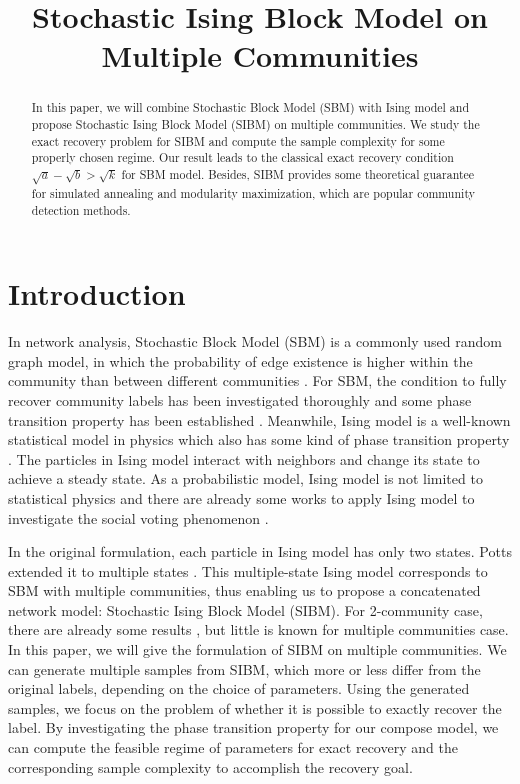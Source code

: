 \label{key}\documentclass[conference]{IEEEtran}
\title{Stochastic Ising Block Model on Multiple Communities}
\author{%
	\IEEEauthorblockN{Feng Zhao}
	\IEEEauthorblockA{Department of Electronic Engineering\\
	Tsinghua University\\ 
	Beijing, China 100084\\
	Email: zhaof17@mails.tsinghua.edu.cn}	
	\and
	\IEEEauthorblockN{Shao-Lun Huang}
	\IEEEauthorblockA{DSIT Research Center\\
	Tsinghua-Berkeley Shenzhen Institute\\
	Shenzhen, China 518055\\
	Email: shaolun.huang@sz.tsinghua.edu.cn}
}
\begin{document}
\maketitle
\begin{abstract}
 In this paper, we will combine Stochastic Block Model (SBM) with Ising model and propose Stochastic Ising Block Model (SIBM) on multiple communities.
 We study the exact recovery problem for SIBM and compute the sample complexity for some properly chosen regime.
 Our result leads to the classical exact recovery condition $\sqrt{a} - \sqrt{b} > \sqrt{k}$ for SBM model.
 Besides, SIBM provides some theoretical guarantee for simulated annealing and modularity maximization, which are popular community detection methods.
\end{abstract}
\section{Introduction}
In network analysis, Stochastic Block Model (SBM) is a commonly used random graph model, in which the probability of edge existence is higher within the community than between different communities \cite{holland1983stochastic}. For SBM, the condition to fully recover community labels has been investigated thoroughly and some phase transition property has been established \cite{Abbe17}. Meanwhile, Ising model is a well-known statistical model in physics which also has some kind of phase transition property \cite{ising1925beitrag}. The particles in Ising model interact with neighbors and change its state to achieve a steady state.
As a probabilistic model, Ising model is not limited to statistical physics and there are already some works to apply Ising model to investigate the social voting phenomenon \cite{sznajd2000opinion}.

In the original formulation, each particle in Ising model has only two states. Potts extended it to multiple states \cite{potts1952some}. This multiple-state Ising model
corresponds to SBM with multiple communities, thus enabling us to propose a concatenated network model: Stochastic Ising Block Model (SIBM). For 2-community case, there are already some results \cite{ye2020exact}, but little is known for multiple communities case. In this paper, we will give the formulation of SIBM on multiple
communities. We can generate multiple samples from SIBM, which more or less differ from the original labels, depending on the choice of parameters. Using the generated samples, we focus on the problem of whether it is possible to exactly recover the label. By investigating the phase transition property for our compose model,
we can compute the feasible regime of parameters for exact recovery and the corresponding sample complexity to accomplish the recovery goal.
\end{document}
